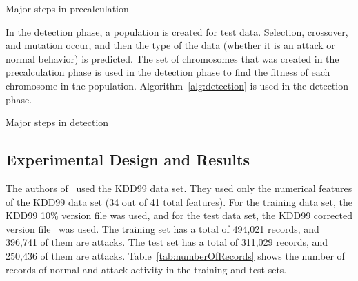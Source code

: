 \documentclass{sig-alternate}
\begin{document}
\begin{algorithm}
\caption{Major steps in precalculation}
\label{alg:precalc}
\begin{algorithmic}
  \ELSE {}
  \ENDIF
\ENDFOR
\end{algorithmic}
\end{algorithm}

In the detection phase, a population is created for test data. Selection, crossover, and mutation occur, and then the type of the data (whether it is an attack or normal behavior) is predicted. The set of chromosomes that was created in the precalculation phase is used in the detection phase to find the fitness of each chromosome in the population. Algorithm~\ref{alg:detection} is used in the detection phase.

\begin{algorithm}
\caption{Major steps in detection}
\label{alg:detection}
\begin{algorithmic}
    \ENDFOR
  \ENDFOR
\ENDWHILE
\end{algorithmic}
\end{algorithm}




\subsection{Experimental Design and Results}
The authors of~\cite{DBLP:journals/corr/abs-1204-1336} used the KDD99 data set. They used only the numerical features of the KDD99 data set (34 out of 41 total features). For the training data set, the KDD99 10\% version file was used, and for the test data set, the KDD99 corrected version file~\cite{KDD99} was used. The training set has a total of 494,021 records, and 396,741 of them are attacks. The test set has a total of 311,029 records, and 250,436 of them are attacks. Table~\ref{tab:numberOfRecords} shows the number of records of normal and attack activity in the training and test sets.
\end{document}
